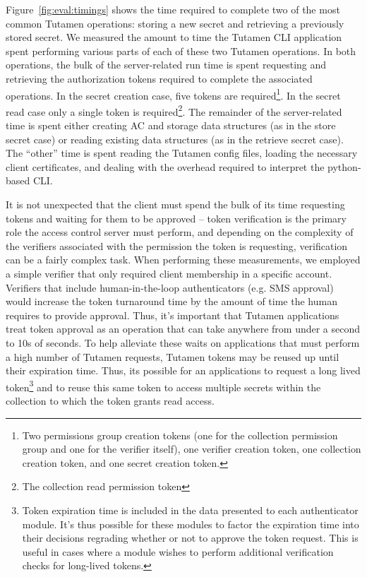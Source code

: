 Figure~\ref{fig:eval:timings} shows the time required to complete two
of the most common Tutamen operations: storing a new secret and
retrieving a previously stored secret. We measured the amount to time
the Tutamen CLI application spent performing various parts of each of
these two Tutamen operations. In both operations, the bulk of the
server-related run time is spent requesting and retrieving the
authorization tokens required to complete the associated
operations. In the secret creation case, five tokens are
required\footnote{Two permissions group creation tokens (one for the
  collection permission group and one for the verifier itself), one
  verifier creation token, one collection creation token, and one
  secret creation token.}. In the secret read case only a single token
is required\footnote{The collection read permission token}. The
remainder of the server-related time is spent either creating AC and
storage data structures (as in the store secret case) or reading
existing data structures (as in the retrieve secret case). The
``other'' time is spent reading the Tutamen config files, loading the
necessary client certificates, and dealing with the overhead required
to interpret the python-based CLI.

It is not unexpected that the client must spend the bulk of its time
requesting tokens and waiting for them to be approved -- token
verification is the primary role the access control server must
perform, and depending on the complexity of the verifiers associated
with the permission the token is requesting, verification can be a
fairly complex task. When performing these measurements, we employed a
simple verifier that only required client membership in a specific
account. Verifiers that include human-in-the-loop authenticators
(e.g. SMS approval) would increase the token turnaround time by the
amount of time the human requires to provide approval. Thus, it's
important that Tutamen applications treat token approval as an
operation that can take anywhere from under a second to 10s of
seconds. To help alleviate these waits on applications that must
perform a high number of Tutamen requests, Tutamen tokens may be
reused up until their expiration time. Thus, its possible for an
applications to request a long lived token\footnote{Token expiration
  time is included in the data presented to each authenticator
  module. It's thus possible for these modules to factor the
  expiration time into their decisions regrading whether or not to
  approve the token request. This is useful in cases where a module
  wishes to perform additional verification checks for long-lived
  tokens.} and to reuse this same token to access multiple secrets
within the collection to which the token grants read access.
 
